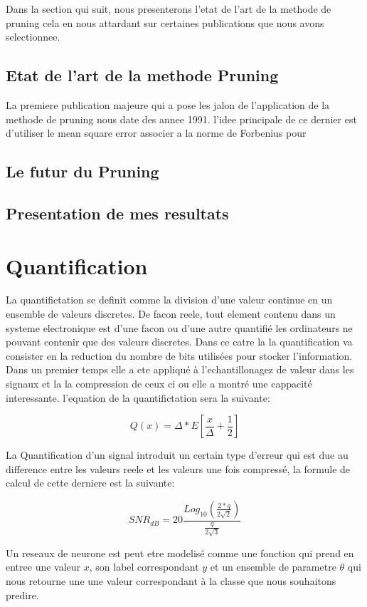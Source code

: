 \documentclass[twoside,twocolumn]{article}
\begin{document}
Dans la section qui suit, nous presenterons l'etat de l'art de la methode de pruning cela en nous  attardant sur certaines publications
que nous avons selectionnee.

\subsection{Etat de l'art de la methode Pruning}
La premiere publication majeure qui a pose les jalon de l'application de la methode de pruning nous date des annee 1991\cite{SYKung}. l'idee principale de ce dernier est 
d'utiliser le mean square error associer a la norme de Forbenius pour 
 
\subsection{Le futur du Pruning}
\subsection{Presentation de mes resultats}

\section{Quantification}%
La quantifictation se definit comme la division d'une valeur continue en un ensemble de valeurs discretes. De facon reele, tout element contenu dans un systeme electronique est
d'une facon ou d'une autre quantifié les ordinateurs ne pouvant contenir que des valeurs discretes. Dans ce catre la la quantification va consister en la reduction du nombre de bits
utilisées pour stocker l'information. Dans un premier temps elle a ete appliqué à l'echantillonagez de valeur dans les signaux et la la compression de ceux ci
ou elle a montré une cappacité interessante. l'equation de la quantifictation sera la suivante:

\[ Q(x) = \Delta * E[\frac{x}{\Delta} + \frac{1}{2}] \]

La Quantification d'un signal introduit un certain type d'erreur qui est due au difference entre les valeurs reele et les valeurs une fois compressé, la formule de calcul de cette derniere est
la suivante:

\[ SNR_{dB} = 20\frac{Log_{10}(\frac{2*q}{2\sqrt{2}})}{\frac{q}{2\sqrt{3}}}\]

Un reseaux de neurone est peut etre modelisé comme une fonction qui prend en entree une valeur $x$, son label correspondant $y$ et un ensemble de parametre $\theta$  qui nous retourne une une valeur correspondant à la classe
que nous souhaitons predire. 
\end{document}
